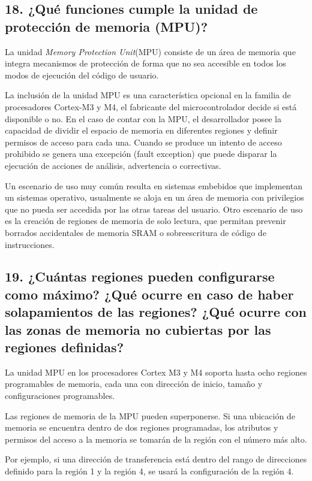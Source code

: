\documentclass[10pt,a4paper,twoside,spanish]{article}	%
\begin{document}
\subsection*{18. ¿Qué funciones cumple la unidad de protección de memoria (MPU)?}

La unidad \textit{Memory Protection Unit}(MPU) consiste de un área de memoria que integra mecanismos de protección de forma que no sea accesible en todos los modos de ejecución del código de usuario. 

La inclusión de la unidad MPU es una característica opcional en la familia de procesadores Cortex-M3 y M4, el fabricante del microcontrolador decide si está disponible o no. En el caso de contar con la MPU, el desarrollador posee la capacidad de dividir el espacio de memoria en diferentes regiones y definir permisos de acceso para cada una. Cuando se produce un intento de acceso prohibido se genera una excepción (fault exception) que puede disparar la ejecución de acciones de análisis, advertencia o correctivas. 

Un escenario de uso muy común resulta en sistemas embebidos que implementan un sistemas operativo, usualmente se aloja en un área de memoria con privilegios que no pueda ser accedida por las otras tareas del usuario. Otro escenario de uso es la creación de regiones de memoria de solo lectura, que permitan prevenir borrados accidentales de memoria SRAM o sobreescritura de código de instrucciones.

\subsection*{19. ¿Cuántas regiones pueden configurarse como máximo? ¿Qué ocurre en caso de haber solapamientos de las regiones? ¿Qué ocurre con las zonas de memoria no cubiertas por las regiones definidas?}

La unidad MPU en los procesadores Cortex M3 y M4 soporta hasta ocho regiones programables de memoria, cada una con dirección de inicio, tamaño y configuraciones programables.

Las regiones de memoria de la MPU pueden superponerse. Si una ubicación de memoria se encuentra dentro de dos regiones programadas, los atributos y permisos del acceso a la memoria se tomarán de la región con el número más alto.

Por ejemplo, si una dirección de transferencia está dentro del rango de direcciones definido para la región 1 y la región 4, se usará la configuración de la región 4.
\end{document}

